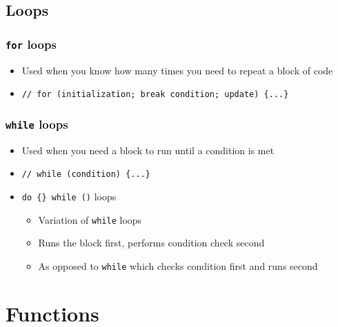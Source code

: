 \documentclass{article}
\begin{document}
\subsection{Loops}

\subsubsection{\texttt{for} loops}

\begin{itemize}
	\item Used when you know how many times you need to repeat a block of code
	\item \texttt{// for (initialization; break condition; update) \{...\}}
	
\end{itemize}

\subsubsection{\texttt{while} loops}

\begin{itemize}
	\item Used when you need a block to run until a condition is met
	\item \texttt{// while (condition) \{...\}}
	
	\item \texttt{do \{\} while ()} loops \begin{itemize}
		\item Variation of \texttt{while} loops
		\item Runs the block first, performs condition check second
		\item As opposed to \texttt{while} which checks condition first and runs second
		
	\end{itemize}
\end{itemize}

\section{Functions}
\end{document}
